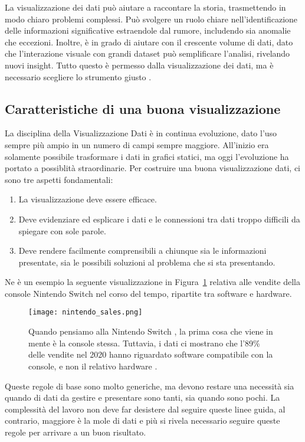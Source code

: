 La visualizzazione dei dati può aiutare a raccontare la storia, trasmettendo in modo chiaro problemi complessi. Può svolgere un ruolo chiare nell'identificazione delle informazioni significative estraendole dal rumore, includendo sia anomalie che eccezioni. Inoltre, è in grado di aiutare con il crescente volume di dati, dato che l'interazione visuale con grandi dataset può semplificare l'analisi, rivelando nuovi insight. Tutto questo è permesso dalla visualizzazione dei dati, ma è necessario scegliere lo strumento giusto \cite{Oracle_Visualizzazione_Dati}.

\subsection{Caratteristiche di una buona visualizzazione}
La disciplina della Visualizzazione Dati è in continua evoluzione, dato l'uso sempre più ampio in un numero di campi sempre maggiore. All'inizio era solamente possibile trasformare i dati in grafici statici, ma oggi l'evoluzione ha portato a possiblità straordinarie.
Per costruire una buona visualizzazione dati, ci sono tre aspetti fondamentali:
\begin{enumerate}
    \item La visualizzazione deve essere efficace.
    \item Deve evidenziare ed esplicare i dati e le connessioni tra dati troppo difficili da spiegare con sole parole.
    \item Deve rendere facilmente comprensibili a chiunque sia le informazioni presentate, sia le possibili soluzioni al problema che si sta presentando.
\end{enumerate}
Ne è un esempio la seguente visualizzazione in Figura~\ref{fig:nintendo_sales} relativa alle vendite della console Nintendo Switch \texttrademark nel corso del tempo, ripartite tra software e hardware.
\begin{figure}
    \centering
    \texttt{[image: nintendo\_sales.png]}
    \caption[Dataviz: vendite di console Nintendo Switch]{Quando pensiamo alla Nintendo Switch \texttrademark, la prima cosa che viene in mente è la console stessa. Tuttavia, i dati ci mostrano che l'89\% delle vendite nel 2020 hanno riguardato software compatibile con la console, e non il relativo hardware \cite{DataVisualization_Caratteristiche}.}
    \label{fig:nintendo_sales}
\end{figure}
Queste regole di base sono molto generiche, ma devono restare una necessità sia quando di dati da gestire e presentare sono tanti, sia quando sono pochi. La complessità del lavoro non deve far desistere dal seguire queste linee guida, al contrario, maggiore è la mole di dati e più si rivela necessario seguire queste regole per arrivare a un buon risultato.
